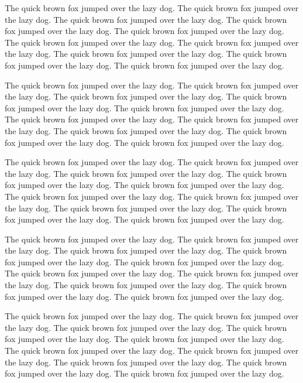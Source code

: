 \documentclass[
  12pt]{article}
\begin{document}
\addtolength{\textheight}{-.5in}%

\addtolength{\textheight}{.2in}%

The quick brown fox jumped over the lazy dog. The quick brown fox jumped
over the lazy dog. The quick brown fox jumped over the lazy dog. The
quick brown fox jumped over the lazy dog. The quick brown fox jumped
over the lazy dog. The quick brown fox jumped over the lazy dog. The
quick brown fox jumped over the lazy dog. The quick brown fox jumped
over the lazy dog. The quick brown fox jumped over the lazy dog. The
quick brown fox jumped over the lazy dog.

The quick brown fox jumped over the lazy dog. The quick brown fox jumped
over the lazy dog. The quick brown fox jumped over the lazy dog. The
quick brown fox jumped over the lazy dog. The quick brown fox jumped
over the lazy dog. The quick brown fox jumped over the lazy dog. The
quick brown fox jumped over the lazy dog. The quick brown fox jumped
over the lazy dog. The quick brown fox jumped over the lazy dog. The
quick brown fox jumped over the lazy dog.

The quick brown fox jumped over the lazy dog. The quick brown fox jumped
over the lazy dog. The quick brown fox jumped over the lazy dog. The
quick brown fox jumped over the lazy dog. The quick brown fox jumped
over the lazy dog. The quick brown fox jumped over the lazy dog. The
quick brown fox jumped over the lazy dog. The quick brown fox jumped
over the lazy dog. The quick brown fox jumped over the lazy dog. The
quick brown fox jumped over the lazy dog.

The quick brown fox jumped over the lazy dog. The quick brown fox jumped
over the lazy dog. The quick brown fox jumped over the lazy dog. The
quick brown fox jumped over the lazy dog. The quick brown fox jumped
over the lazy dog. The quick brown fox jumped over the lazy dog. The
quick brown fox jumped over the lazy dog. The quick brown fox jumped
over the lazy dog. The quick brown fox jumped over the lazy dog. The
quick brown fox jumped over the lazy dog.

The quick brown fox jumped over the lazy dog. The quick brown fox jumped
over the lazy dog. The quick brown fox jumped over the lazy dog. The
quick brown fox jumped over the lazy dog. The quick brown fox jumped
over the lazy dog. The quick brown fox jumped over the lazy dog. The
quick brown fox jumped over the lazy dog. The quick brown fox jumped
over the lazy dog. The quick brown fox jumped over the lazy dog. The
quick brown fox jumped over the lazy dog.
\end{document}
